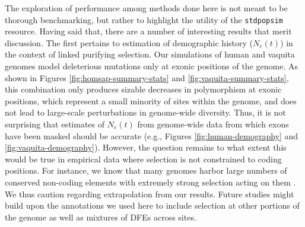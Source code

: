 \documentclass[hidelinks]{article}
\newcommand{\stdpopsim}{\texttt{stdpopsim}\xspace}
\begin{document}
    The exploration of performance among methods done here is not meant to be thorough
    benchmarking, but rather to highlight the utility of the \stdpopsim resource.
    Having said that, there are a number of interesting results that merit discussion.
    The first pertains to estimation of demographic history ($N_e(t)$) in the context of
    linked purifying selection. Our simulations of human and vaquita genomes
    model deleterious mutations only at exonic positions of the genome.
    As shown in Figures \ref{fig:homsap-summary-stats} and \ref{fig:vaquita-summary-stats},
    this combination only produces sizable decreases in polymorphism at exonic positions,
    which represent a small minority of sites within the genome, and does not lead to large-scale
    perturbations in genome-wide diversity. Thus, it is not surprising that estimates of $N_e(t)$
    from genome-wide data from which exons have been masked should be accurate
    (e.g., Figures \ref{fig:human-demography} and \ref{fig:vaquita-demography}).
    However, the question remains to what extent this would be true in empirical data where
    selection is not constrained to coding positions. For instance, we know
    that many genomes harbor large numbers
    of conserved non-coding elements \citep[e.g.,][]{siepel2005evolutionarily} with extremely
    strong selection acting on them \citep{katzman2007human,mclean2008dispensability}.
    We thus caution regarding extrapolation from our results. Future studies might build upon
    the annotations we used here to include selection at other portions of the genome as well
    as mixtures of DFEs across sites.
\end{document}
